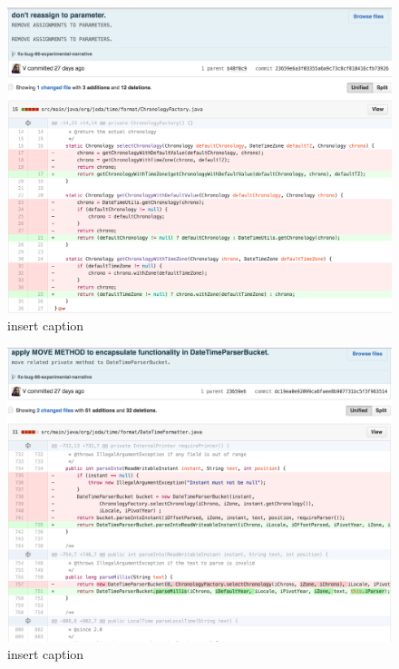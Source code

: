 \begin{figure}[H]
	\centering
	\includegraphics[width=\linewidth]{code58}
	\caption{insert caption}
\end{figure}
\begin{figure}[H]
	\centering
	\includegraphics[width=\linewidth]{code59}
	\caption{insert caption}
\end{figure}
